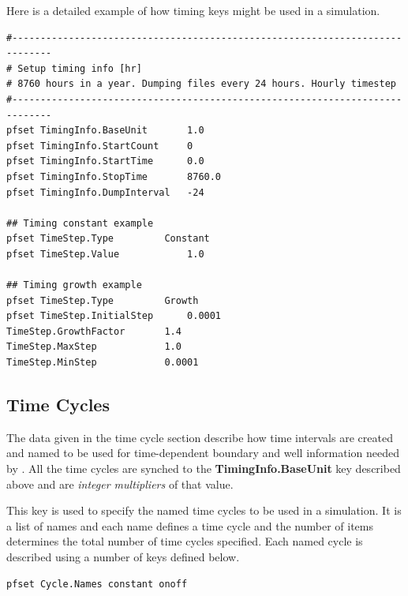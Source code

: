 Here is a detailed example of how timing keys might be used in a simulation.
\begin{display}\begin{verbatim}
#-----------------------------------------------------------------------------
# Setup timing info [hr]
# 8760 hours in a year. Dumping files every 24 hours. Hourly timestep
#-----------------------------------------------------------------------------
pfset TimingInfo.BaseUnit		1.0
pfset TimingInfo.StartCount		0
pfset TimingInfo.StartTime		0.0
pfset TimingInfo.StopTime		8760.0
pfset TimingInfo.DumpInterval	-24

## Timing constant example
pfset TimeStep.Type			Constant
pfset TimeStep.Value			1.0

## Timing growth example
pfset TimeStep.Type			Growth
pfset TimeStep.InitialStep		0.0001
TimeStep.GrowthFactor		1.4
TimeStep.MaxStep			1.0
TimeStep.MinStep			0.0001
\end{verbatim}\end{display}



\subsection{Time Cycles}
\label{Time Cycles}

The data given in the time cycle section describe how time intervals are created and named to be used for time-dependent boundary and well information needed by \parflow{}.  All the time cycles are synched to the {\bf TimingInfo.BaseUnit} key described above and are {\em integer multipliers} of that value.

{
This key is used to specify the named time cycles to be used in a simulation.  It is a list of names and each name defines a time cycle and the number of items determines the total number of time cycles specified.  Each named cycle is described using a number of keys defined below.
}
\begin{display}\begin{verbatim}
pfset Cycle.Names constant onoff
\end{verbatim}\end{display}

